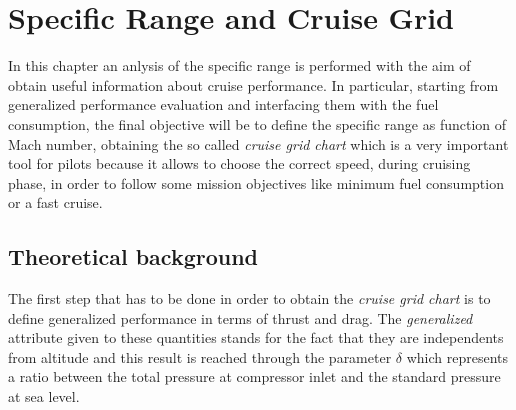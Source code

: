 \chapter{Specific Range and Cruise Grid}


\noindent
In this chapter an anlysis of the specific range is performed with the aim of obtain useful information about cruise performance. 
%
In particular, starting from generalized performance evaluation and interfacing them with the fuel consumption, the final objective will be to define the specific range as function of Mach number, obtaining the so called \emph{cruise grid chart} which is a very important tool for pilots because it allows to choose the correct speed, during cruising phase, in order to follow some mission objectives like minimum fuel consumption or a fast cruise.
%
\section{Theoretical background}
The first step that has to be done in order to obtain the \emph{cruise grid chart} is to define generalized performance in terms of thrust and drag. The \emph{generalized} attribute given to these quantities stands for the fact that they are independents from altitude and this result is reached through the parameter $\delta$ which represents a ratio between the total pressure at compressor inlet and  the standard pressure at sea level. 

